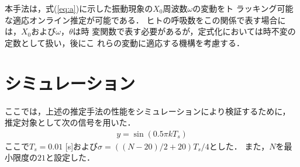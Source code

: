 \documentclass{ieej}
\begin{document}
本手法は，式(\ref{eq:a})に示した振動現象の$X_0$周波数$\omega$の変動をト
ラッキング可能な適応オンライン推定が可能である．
%
ヒトの呼吸数をこの関係で表す場合には，$X_0$および$\omega$，$\theta$は時
変関数で表す必要があるが，定式化においては時不変の定数として扱い，後にこ
れらの変動に適応する機構を考慮する．

\section{シミュレーション}
ここでは，上述の推定手法の性能をシミュレーションにより検証するために，
推定対象として次の信号を用いた．
\begin{align}
 y=\sin(0.5\pi kT_s)
\end{align}
ここで$T_s=0.01$ [s]および$\sigma=((N-20)/2+20)T_s/4$とした．
また，$N$を最小限度の$21$と設定した．
\end{document}
